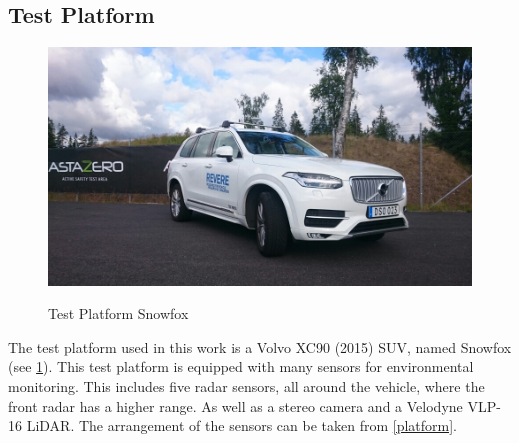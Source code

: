 \subsection{Test Platform}

\begin{figure}[!ht]
\caption{Test Platform Snowfox}
\includegraphics[width=\columnwidth]{bilder/snowfox.jpg}
\label{snowfox}
\end{figure}


The test platform used in this work is a Volvo XC90 (2015) SUV, named Snowfox (see \cref{snowfox}). 
This test platform is equipped with many sensors for environmental monitoring. This includes five radar sensors, all around the vehicle, where the front radar has a higher range.
As well as a stereo camera and a Velodyne VLP-16 LiDAR. The arrangement of the sensors can be taken from \cref{platform}.


